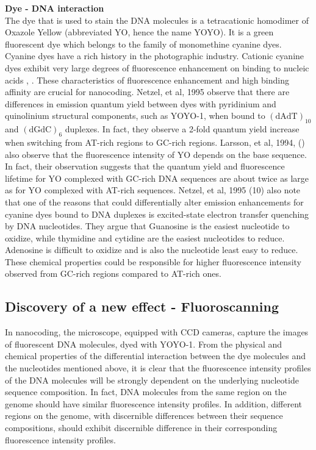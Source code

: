 \documentclass[11pt]{extarticle} %
\begin{document}
\noindent
{\bf{Dye - DNA interaction}} \\
The dye that is used to stain the DNA molecules is a tetracationic homodimer of Oxazole Yellow (abbreviated YO, hence the name YOYO). It is a green fluorescent dye which belongs to the family of monomethine cyanine dyes. Cyanine dyes have a rich history in the photographic industry. Cationic  cyanine dyes  exhibit very large degrees of fluorescence enhancement on binding to nucleic acids \cite{Rye_etal_1992_NAR}, \cite{Lee_etal_1986_Cytometry}. These  characteristics of fluorescence enhancement and  high binding affinity are crucial for nanocoding. Netzel, et al, 1995 \cite{Netzel_etal_1995_JPC} observe that there are differences in emission quantum yield between dyes with pyridinium and quinolinium structural components, such as YOYO-1, when bound to $(\text{dAdT})_{10}$ and $(\text{dGdC})_6$ duplexes. In fact, they observe a 2-fold quantum yield increase when switching from AT-rich regions to GC-rich regions. Larsson, et al, 1994, (\cite{Larsson_etal_1994_JACS}) also observe that the fluorescence intensity of YO depends on the base sequence. In fact, their observation suggests that the quantum yield and fluorescence lifetime for YO complexed with GC-rich DNA sequences are about twice as large as for YO complexed with AT-rich sequences. Netzel, et al, 1995 (10) also note that one of the reasons that could differentially alter emission enhancements for cyanine dyes bound to DNA  duplexes is excited-state electron transfer quenching by DNA nucleotides. They argue that Guanosine is the easiest nucleotide to oxidize, while thymidine and cytidine are the easiest nucleotides to reduce. Adenosine is difficult to oxidize and is also the nucleotide least easy to reduce. These chemical properties could be responsible for higher fluorescence intensity observed from GC-rich regions compared to AT-rich ones. 

\subsection{Discovery of a new effect - Fluoroscanning}
In nanocoding, the microscope, equipped with CCD cameras, capture the images of fluorescent DNA molecules, dyed with YOYO-1. From the physical and chemical properties of the differential interaction between the dye molecules and the nucleotides mentioned above, it is clear that the fluorescence intensity profiles of the DNA molecules will be strongly dependent on the underlying nucleotide sequence composition. In fact, DNA molecules from the same region on the genome should have similar  fluorescence intensity profiles. In addition, different regions on the genome, with discernible differences between their sequence compositions, should exhibit discernible difference in their corresponding  fluorescence intensity profiles. \\
\end{document}
